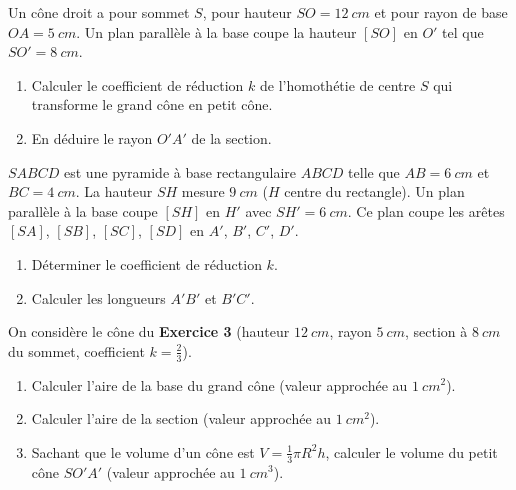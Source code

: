 \documentclass[11pt]{article}
\begin{document}
\begin{exercice}
Un cône droit a pour sommet $S$, pour hauteur $SO = \SI{12}{cm}$ et pour rayon de base $OA = \SI{5}{cm}$.
Un plan parallèle à la base coupe la hauteur $[SO]$ en $O'$ tel que $SO' = \SI{8}{cm}$.
\begin{enumerate}
    \item Calculer le coefficient de réduction $k$ de l'homothétie de centre $S$ qui transforme le grand cône en petit cône.
    \item En déduire le rayon $O'A'$ de la section.
\end{enumerate}
\end{exercice}

\begin{exercice}
$SABCD$ est une pyramide à base rectangulaire $ABCD$ telle que $AB = \SI{6}{cm}$ et $BC = \SI{4}{cm}$. La hauteur $SH$ mesure $\SI{9}{cm}$ ($H$ centre du rectangle).
Un plan parallèle à la base coupe $[SH]$ en $H'$ avec $SH' = \SI{6}{cm}$. Ce plan coupe les arêtes $[SA]$, $[SB]$, $[SC]$, $[SD]$ en $A'$, $B'$, $C'$, $D'$.
\begin{enumerate}
    \item Déterminer le coefficient de réduction $k$.
    \item Calculer les longueurs $A'B'$ et $B'C'$.
\end{enumerate}
\end{exercice}

\begin{exercice}
On considère le cône du \textbf{Exercice 3} (hauteur $\SI{12}{cm}$, rayon $\SI{5}{cm}$, section à $\SI{8}{cm}$ du sommet, coefficient $k = \frac{2}{3}$).
\begin{enumerate}
    \item Calculer l'aire de la base du grand cône (valeur approchée au $\SI{1}{cm^2}$).
    \item Calculer l'aire de la section (valeur approchée au $\SI{1}{cm^2}$).
    \item Sachant que le volume d'un cône est $V = \frac{1}{3}\pi R^2 h$, calculer le volume du petit cône $SO'A'$ (valeur approchée au $\SI{1}{cm^3}$).
\end{enumerate}
\end{exercice}
\end{document}
